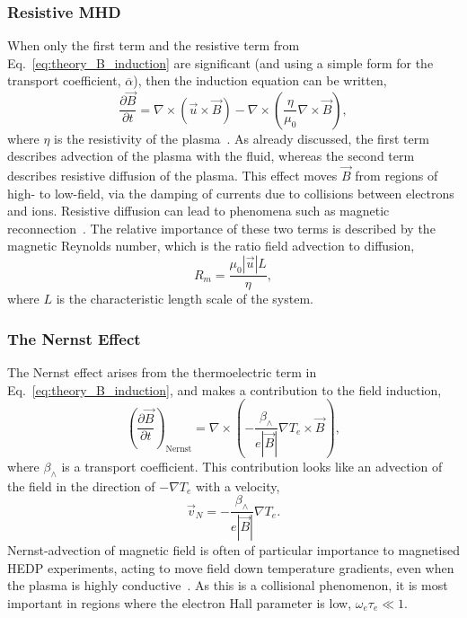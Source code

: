 \subsubsection{Resistive MHD}%
\label{sec:theory_resisMHD}

When only the first term and the resistive term from Eq.~\ref{eq:theory_B_induction} are significant (and using a simple form for the transport coefficient, $\overline{\alpha}$), then the induction equation can be written,
\begin{equation}
    \frac{\partial \vec{B}}{\partial t} = \nabla \times \left( \vec{u}\times\vec{B} \right) - \nabla \times \left( \frac{\eta}{\mu_0}\nabla\times \vec{B} \right),
\end{equation}
where $\eta$ is the resistivity of the plasma~\cite{farrow_extended_2023}.
As already discussed, the first term describes advection of the plasma with the fluid, whereas the second term describes resistive diffusion of the plasma.
This effect moves $\vec{B}$ from regions of high- to low-field, via the damping of currents due to collisions between electrons and ions.
Resistive diffusion can lead to phenomena such as magnetic reconnection~\cite{kuznetsova_multiscale_2007,perez-colljimenez_role_2022}.
The relative importance of these two terms is described by the magnetic Reynolds number, which is the ratio field advection to diffusion,
\begin{equation}
    R_m = \frac{\mu_0 |\vec{u}| L}{\eta},
\end{equation}
where $L$ is the characteristic length scale of the system.

\subsubsection{The Nernst Effect}%
\label{sec:theory_nernst}

The Nernst effect arises from the thermoelectric term in Eq.~\ref{eq:theory_B_induction}, and makes a contribution to the field induction,
\begin{equation}
    \left( \frac{\partial \vec{B}}{\partial t} \right)_{\text{Nernst}} = \nabla \times \left( - \frac{\beta_{\wedge}}{e |\vec{B}|}\nabla T_e \times \vec{B} \right),
\end{equation}
where $\beta_{\wedge}$ is a transport coefficient.
This contribution looks like an advection of the field in the direction of $-\nabla T_e$ with a velocity,
\begin{equation}
    \vec{v}_{N} = -\frac{\beta_{\wedge}}{e |\vec{B}|}\nabla T_e.
\end{equation}
Nernst-advection of magnetic field is often of particular importance to magnetised \ac{HEDP} experiments, acting to move field down temperature gradients, even when the plasma is highly conductive~\cite{slutz_pulsedpowerdriven_2010,walsh_extended_2018}.
As this is a collisional phenomenon, it is most important in regions where the electron Hall parameter is low, $\omega_e\tau_e\ll 1$.

